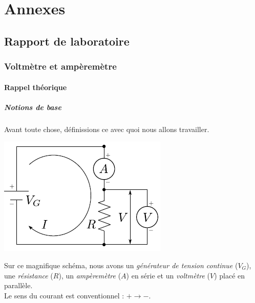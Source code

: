\documentclass	[11pt, a4paper, openany]{book}
\begin{document}
		
		
		
		
		
		
		
		
		
		
		
		
		
		
		
		
		
		
		
		
		
		
		
		
		
		\appendix
		\part{Annexes}
		\chapter{Rapport de laboratoire}
		\section{Voltmètre et ampèremètre}
		\subsection{Rappel théorique}
		\subsubsection{Notions de base}
		Avant toute chose, définissions ce avec quoi nous allons travailler.
		\begin{center}
			\includegraphics[scale=0.5]{labo/image8.png}
		\end{center}
		Sur ce magnifique schéma, nous avons un \textit{générateur de tension continue} ($V_G$), une \textit{résistance} ($R$), un \textit{ampèremètre} ($A$) en série et un \textit{voltmètre} ($V$) placé en parallèle.\\
		Le sens du courant est conventionnel : $+ \rightarrow -$.
		
\end{document}
